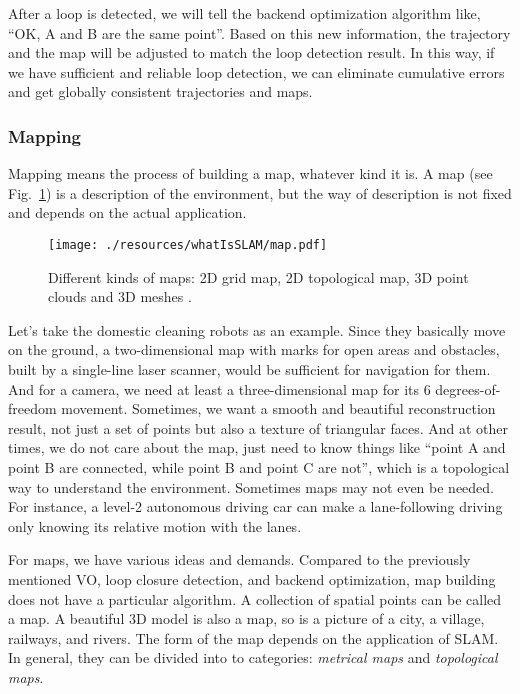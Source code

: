After a loop is detected, we will tell the backend optimization algorithm like, ``OK,  A and B are the same point''. Based on this new information, the trajectory and the map will be adjusted to match the loop detection result. In this way, if we have sufficient and reliable loop detection, we can eliminate cumulative errors and get globally consistent trajectories and maps.

\subsubsection{Mapping}
Mapping means the process of building a map, whatever kind it is. A map (see Fig.~\ref{fig:mapping}) is a description of the environment, but the way of description is not fixed and depends on the actual application.

\begin{figure}
	\centering
	\texttt{[image: ./resources/whatIsSLAM/map.pdf]}
	\caption{Different kinds of maps: 2D grid map, 2D topological map, 3D point clouds and 3D meshes \cite{Beeson2010}.}
	\label{fig:mapping}
\end{figure}

Let's take the domestic cleaning robots as an example. Since they basically move on the ground, a two-dimensional map with marks for open areas and obstacles, built by a single-line laser scanner, would be sufficient for navigation for them. And for a camera, we need at least a three-dimensional map for its 6 degrees-of-freedom movement. Sometimes, we want a smooth and beautiful reconstruction result, not just a set of points but also a texture of triangular faces. And at other times, we do not care about the map, just need to know things like ``point A and point B are connected, while point B and point C are not'', which is a topological way to understand the environment. Sometimes maps may not even be needed. For instance, a level-2 autonomous driving car can make a lane-following driving only knowing its relative motion with the lanes.

For maps, we have various ideas and demands. Compared to the previously mentioned VO, loop closure detection, and backend optimization, map building does not have a particular algorithm. A collection of spatial points can be called a map. A beautiful 3D model is also a map, so is a picture of a city, a village, railways, and rivers. The form of the map depends on the application of SLAM. In general, they can be divided into to categories: \emph{metrical maps} and \emph{topological maps}.

